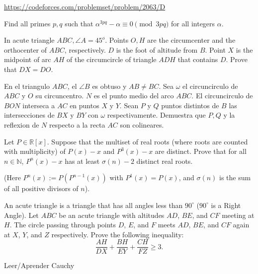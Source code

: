 \documentclass[11pt]{scrartcl}
\begin{document}
\begin{problem}[CF 2063D]
\url{https://codeforces.com/problemset/problem/2063/D}
\end{problem}
\begin{problem}
Find all primes $ p,q $ such that $ \alpha^{3pq} -\alpha \equiv 0 \pmod {3pq} $ for all integers $ \alpha $.
\end{problem}
\begin{problem}
	In acute triangle $ABC, \angle A = 45^o$. Points $O,H$ are the circumcenter and the orthocenter of $ABC$, respectively. $D$ is the foot of altitude from $B$. Point $X$ is the midpoint of arc $AH$ of the circumcircle of triangle $ADH$ that contains $D$. Prove that $DX = DO$.
\end{problem}
\begin{problem}
En el triangulo $ABC$, el $\angle B$ es obtuso y $AB \neq BC$. Sea $\omega$ el circuncirculo de $ABC$ y $O$ su circuncentro. $N$ es el punto medio del arco $ABC$. El circuncirculo de $BON$ interseca a $AC$ en puntos $X$ y $Y$. Sean $P$ y $Q$ puntos distintos de $B$ las intersecciones de $BX$ y $BY$ con $\omega$ respectivamente. Demuestra que $P,Q$ y la reflexion de $N$ respecto a la recta $AC$ son colineares.  
\end{problem}
\begin{problem}
Let $P \in \mathbb{R}[x]$. Suppose that the multiset of real roots (where roots are counted with multiplicity) of $P(x)-x$ and $P^3(x)-x$ are distinct. Prove that for all $n\in \mathbb{N}$, $P^n(x)-x$ has at least $\sigma(n)-2$ distinct real roots.

(Here $P^n(x):=P(P^{n-1}(x))$ with $P^1(x) = P(x)$, and $\sigma(n)$ is the sum of all positive divisors of $n$).
\end{problem}
\begin{problem}[Canada 2023/3]
    An acute triangle is a triangle that has all angles less than $90^{\circ}$ ($90^{\circ}$ is a Right Angle). Let $ABC$ be an acute triangle with altitudes $AD$, $BE$, and $CF$ meeting at $H$. The circle passing through points $D$, $E$, and $F$ meets $AD$, $BE$, and $CF$ again at $X$, $Y$, and $Z$ respectively. Prove the following inequality:$$\frac{AH}{DX}+\frac{BH}{EY}+\frac{CH}{FZ} \geq 3.$$
\end{problem}
\begin{problem}
Leer/Aprender Cauchy
\end{problem}
\end{document}
